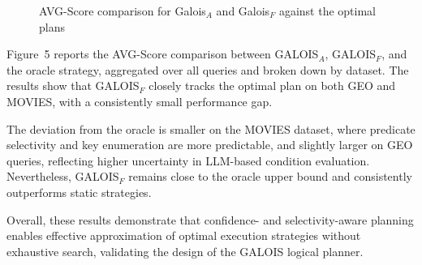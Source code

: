 \documentclass[11pt]{article}
\begin{document}
\begin{figure}[ht]
\centering
{}
\caption{AVG-Score comparison for Galois$_A$ and Galois$_F$ against the optimal plans}
\label{fig:exp8_avgscore}
\end{figure}

Figure~5 reports the AVG-Score comparison between GALOIS\(_A\), GALOIS\(_F\), and the oracle strategy, aggregated over all queries and broken down by dataset. The results show that GALOIS\(_F\) closely tracks the optimal plan on both GEO and MOVIES, with a consistently small performance gap.

The deviation from the oracle is smaller on the MOVIES dataset, where predicate selectivity and key enumeration are more predictable, and slightly larger on GEO queries, reflecting higher uncertainty in LLM-based condition evaluation. Nevertheless, GALOIS\(_F\) remains close to the oracle upper bound and consistently outperforms static strategies.

Overall, these results demonstrate that confidence- and selectivity-aware planning enables effective approximation of optimal execution strategies without exhaustive search, validating the design of the GALOIS logical planner.
\end{document}
